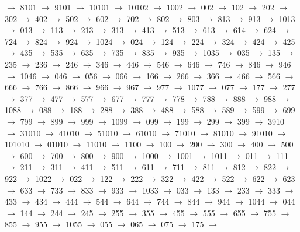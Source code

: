 $\rightarrow$ 8101 $\rightarrow$ 9101 $\rightarrow$ 10101 $\rightarrow$ 10102 $\rightarrow$ 1002 $\rightarrow$ 002 $\rightarrow$ 102 $\rightarrow$ 202 $\rightarrow$ 302 $\rightarrow$ 402 $\rightarrow$ 502 $\rightarrow$ 602 $\rightarrow$ 702 $\rightarrow$ 802 $\rightarrow$ 803 $\rightarrow$ 813 $\rightarrow$ 913 $\rightarrow$ 1013 $\rightarrow$ 013 $\rightarrow$ 113 $\rightarrow$ 213 $\rightarrow$ 313 $\rightarrow$ 413 $\rightarrow$ 513 $\rightarrow$ 613 $\rightarrow$ 614 $\rightarrow$ 624 $\rightarrow$ 724 $\rightarrow$ 824 $\rightarrow$ 924 $\rightarrow$ 1024 $\rightarrow$ 024 $\rightarrow$ 124 $\rightarrow$ 224 $\rightarrow$ 324 $\rightarrow$ 424 $\rightarrow$ 425 $\rightarrow$ 435 $\rightarrow$ 535 $\rightarrow$ 635 $\rightarrow$ 735 $\rightarrow$ 835 $\rightarrow$ 935 $\rightarrow$ 1035 $\rightarrow$ 035 $\rightarrow$ 135 $\rightarrow$ 235 $\rightarrow$ 236 $\rightarrow$ 246 $\rightarrow$ 346 $\rightarrow$ 446 $\rightarrow$ 546 $\rightarrow$ 646 $\rightarrow$ 746 $\rightarrow$ 846 $\rightarrow$ 946 $\rightarrow$ 1046 $\rightarrow$ 046 $\rightarrow$ 056 $\rightarrow$ 066 $\rightarrow$ 166 $\rightarrow$ 266 $\rightarrow$ 366 $\rightarrow$ 466 $\rightarrow$ 566 $\rightarrow$ 666 $\rightarrow$ 766 $\rightarrow$ 866 $\rightarrow$ 966 $\rightarrow$ 967 $\rightarrow$ 977 $\rightarrow$ 1077 $\rightarrow$ 077 $\rightarrow$ 177 $\rightarrow$ 277 $\rightarrow$ 377 $\rightarrow$ 477 $\rightarrow$ 577 $\rightarrow$ 677 $\rightarrow$ 777 $\rightarrow$ 778 $\rightarrow$ 788 $\rightarrow$ 888 $\rightarrow$ 988 $\rightarrow$ 1088 $\rightarrow$ 088 $\rightarrow$ 188 $\rightarrow$ 288 $\rightarrow$ 388 $\rightarrow$ 488 $\rightarrow$ 588 $\rightarrow$ 589 $\rightarrow$ 599 $\rightarrow$ 699 $\rightarrow$ 799 $\rightarrow$ 899 $\rightarrow$ 999 $\rightarrow$ 1099 $\rightarrow$ 099 $\rightarrow$ 199 $\rightarrow$ 299 $\rightarrow$ 399 $\rightarrow$ 3910 $\rightarrow$ 31010 $\rightarrow$ 41010 $\rightarrow$ 51010 $\rightarrow$ 61010 $\rightarrow$ 71010 $\rightarrow$ 81010 $\rightarrow$ 91010 $\rightarrow$ 101010 $\rightarrow$ 01010 $\rightarrow$ 11010 $\rightarrow$ 1100 $\rightarrow$ 100 $\rightarrow$ 200 $\rightarrow$ 300 $\rightarrow$ 400 $\rightarrow$ 500 $\rightarrow$ 600 $\rightarrow$ 700 $\rightarrow$ 800 $\rightarrow$ 900 $\rightarrow$ 1000 $\rightarrow$ 1001 $\rightarrow$ 1011 $\rightarrow$ 011 $\rightarrow$ 111 $\rightarrow$ 211 $\rightarrow$ 311 $\rightarrow$ 411 $\rightarrow$ 511 $\rightarrow$ 611 $\rightarrow$ 711 $\rightarrow$ 811 $\rightarrow$ 812 $\rightarrow$ 822 $\rightarrow$ 922 $\rightarrow$ 1022 $\rightarrow$ 022 $\rightarrow$ 122 $\rightarrow$ 222 $\rightarrow$ 322 $\rightarrow$ 422 $\rightarrow$ 522 $\rightarrow$ 622 $\rightarrow$ 623 $\rightarrow$ 633 $\rightarrow$ 733 $\rightarrow$ 833 $\rightarrow$ 933 $\rightarrow$ 1033 $\rightarrow$ 033 $\rightarrow$ 133 $\rightarrow$ 233 $\rightarrow$ 333 $\rightarrow$ 433 $\rightarrow$ 434 $\rightarrow$ 444 $\rightarrow$ 544 $\rightarrow$ 644 $\rightarrow$ 744 $\rightarrow$ 844 $\rightarrow$ 944 $\rightarrow$ 1044 $\rightarrow$ 044 $\rightarrow$ 144 $\rightarrow$ 244 $\rightarrow$ 245 $\rightarrow$ 255 $\rightarrow$ 355 $\rightarrow$ 455 $\rightarrow$ 555 $\rightarrow$ 655 $\rightarrow$ 755 $\rightarrow$ 855 $\rightarrow$ 955 $\rightarrow$ 1055 $\rightarrow$ 055 $\rightarrow$ 065 $\rightarrow$ 075 $\rightarrow$ 175 $\rightarrow$ 